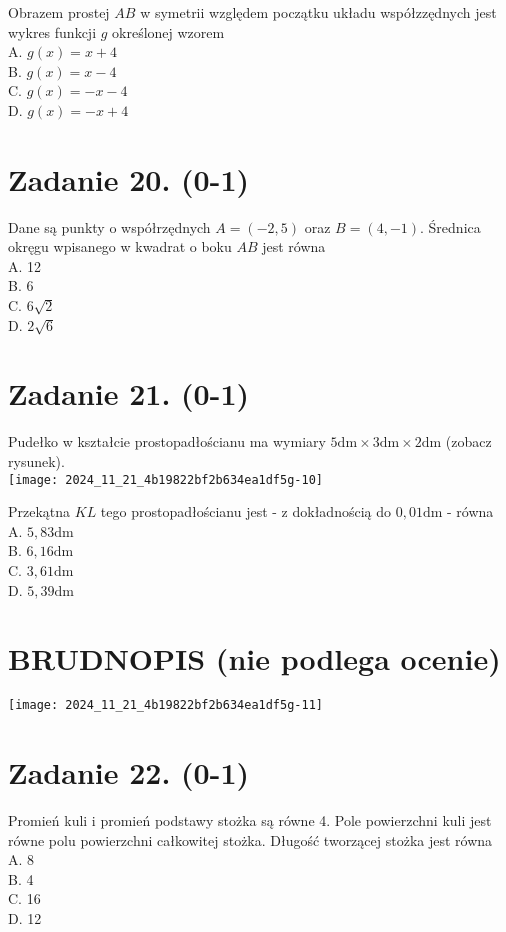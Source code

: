 \documentclass[10pt]{article}
\begin{document}
Obrazem prostej \(A B\) w symetrii względem początku układu współzzędnych jest wykres funkcji \(g\) określonej wzorem\\
A. \(g(x)=x+4\)\\
B. \(g(x)=x-4\)\\
C. \(g(x)=-x-4\)\\
D. \(g(x)=-x+4\)

\section*{Zadanie 20. (0-1)}
Dane są punkty o współrzędnych \(A=(-2,5)\) oraz \(B=(4,-1)\). Średnica okręgu wpisanego w kwadrat o boku \(A B\) jest równa\\
A. 12\\
B. 6\\
C. \(6 \sqrt{2}\)\\
D. \(2 \sqrt{6}\)

\section*{Zadanie 21. (0-1)}
Pudełko w kształcie prostopadłościanu ma wymiary \(5 \mathrm{dm} \times 3 \mathrm{dm} \times 2 \mathrm{dm}\) (zobacz rysunek).\\
\texttt{[image: 2024\_11\_21\_4b19822bf2b634ea1df5g-10]}

Przekątna \(K L\) tego prostopadłościanu jest - z dokładnością do \(0,01 \mathrm{dm}\) - równa\\
A. \(5,83 \mathrm{dm}\)\\
B. \(6,16 \mathrm{dm}\)\\
C. \(3,61 \mathrm{dm}\)\\
D. \(5,39 \mathrm{dm}\)

\section*{BRUDNOPIS (nie podlega ocenie)}
\begin{center}
\texttt{[image: 2024\_11\_21\_4b19822bf2b634ea1df5g-11]}
\end{center}

\section*{Zadanie 22. (0-1)}
Promień kuli i promień podstawy stożka są równe 4. Pole powierzchni kuli jest równe polu powierzchni całkowitej stożka. Długość tworzącej stożka jest równa\\
A. 8\\
B. 4\\
C. 16\\
D. 12
\end{document}
